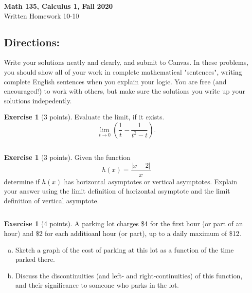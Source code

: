 \documentclass[11pt,reqno,final]{amsart}
\numberwithin{equation}{section}
\numberwithin{figure}{section}
\theoremstyle{definition} %
\newtheorem{exercise}[question]{Exercise}
\newcommand{\dlim}{\displaystyle\lim}
\begin{document}
\begin{center}
        \textbf{\Large Math 135, Calculus 1, Fall 2020}\\[10pt]
        {\large Written Homework 10-10}
\end{center}

\thispagestyle{empty}

\renewcommand{\thesection}{\Alph{section}}

\subsection*{Directions:}
Write your solutions neatly and clearly, and submit to Canvas.
In these problems, you should show all of your work in complete mathematical "sentences", writing complete English sentences when you explain your logic.
You are free (and encouraged!) to work with others, but make sure the solutions you write up your solutions indepedently.

\begin{exercise}[3 points]
        Evaluate the limit, if it exists.
        \[
                \dlim_{t \to 0} \left( \dfrac{1}{t} - \dfrac{1}{t^2-t} \right).
        \]        
\end{exercise}

$ $

\begin{exercise}[3 points]
        Given the function
        \[
                h(x) = \dfrac{|x-2|}{x}
        \]
        determine if $h(x)$ has horizontal asymptotes or vertical asymptotes.
        Explain your answer using the limit definition of horizontal asymptote and the limit definition of vertical asymptote.
\end{exercise}

$ $

\begin{exercise}[4 points]
        A parking lot charges \$4 for the first hour (or part of an hour) and \$2 for each additioanl hour (or part), up to a daily maximum of \$12.
        \begin{enumerate}[(a)]
        \item Sketch a graph of the cost of parking at this lot as a function of the time parked there.
        \item Discuss the discontinuities (and left- and right-continuities) of this function, and their significance to someone who parks in the lot.
        \end{enumerate}
\end{exercise}
\end{document}
